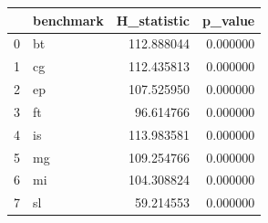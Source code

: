 \begin{tabular}{llrr}
\toprule
 & benchmark & H_statistic & p_value \\
\midrule
0 & bt & 112.888044 & 0.000000 \\
1 & cg & 112.435813 & 0.000000 \\
2 & ep & 107.525950 & 0.000000 \\
3 & ft & 96.614766 & 0.000000 \\
4 & is & 113.983581 & 0.000000 \\
5 & mg & 109.254766 & 0.000000 \\
6 & mi & 104.308824 & 0.000000 \\
7 & sl & 59.214553 & 0.000000 \\
\bottomrule
\end{tabular}

